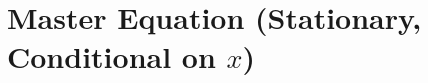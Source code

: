 \documentclass[11pt,letterpaper,oneside]{article}
\numberwithin{equation}{section}
\newcommand{\1}{\mathbf{1}}
\newcommand{\diff}{,\mathrm{d}}
\newcommand{\Lz}{L\_z}
\newcommand{\Lx}{L\_x}
\newcommand{\dmU}{\delta\_m U}
\begin{document}
\section[Master Equation (Stationary, Conditional on x)]{Master Equation (Stationary, Conditional on $x$)}
\begin{comment}
Define the master value $U(k,z,x,m)$ and the Lions derivative $\dmU(\xi;k,z,x,m)$ at $\xi=(\kappa,\zeta)$. The drift at $\xi$ is

$$
b(\xi,x,m)=(i^*(\xi,x,m)-\delta\kappa)\,e_k+\mu_z(\zeta)\,e_z,
$$

and diffusion is only in $z$ with variance $\sigma_z^2$. The stationary master equation reads
\begin{equation}
\boxed{
\begin{aligned}
r(x),U(k,z,x,m)=\ &\max\_{i}\big{\pi(k,i,z,x,m)+U\_k(i-\delta k)+\Lz U+\Lx U\big}\\
&\ +\int\Big\[(i^\*(\xi,x,m)-\delta\kappa),\partial\_\kappa\dmU
+\mu\_z(\zeta),\partial\_\zeta\dmU
+\tfrac12\sigma\_z^2,\partial\_{\zeta\zeta}^2\dmU\Big], m(\diff \xi)\\
&\ +\underbrace{\int \delta\_m \pi(\xi;,k,z,x,m), m(\diff \xi)}\_{\text{direct price externality}}.
\end{aligned}}
\tag{ME}\label{eq:ME}
\end{equation}

\begin{proposition}[Price-externality simplification]\label{prop:externality}
Since $\pi$ depends on $m$ only through $Y$,

$$
\delta_m \pi(\xi;\,k,z,x,m)= P'(Y)\,\underbrace{e^{x+z}k^\alpha}_{\text{this firm}}\ \underbrace{e^{x+\zeta}\kappa^\alpha}_{\text{marginal firm}},
$$

hence

$$
\int \delta_m \pi(\xi;\,k,z,x,m)\, m(\diff \xi)
= e^{x+z}k^\alpha\,Y(m,x)\,P'(Y(m,x)).
$$

If $P(Y)=Y^{-\eta}$, then by \eqref{eq:isoelastic} the term equals $-\eta\,P(Y)\,e^{x+z}k^\alpha$.
\end{proposition}

\begin{proof}\[Sketch]
Apply \Cref{lem:chain} with $\varphi(\xi)=e^{x+\zeta}\kappa^\alpha$. The derivative of $m\mapsto P(Y(m,x))$ is $P'(Y)\varphi(\xi)$. Multiplying by the firm-specific factor $e^{x+z}k^\alpha$ and integrating over $\xi$ gives the stated expression.
\end{proof}


\end{comment}
\end{document}
